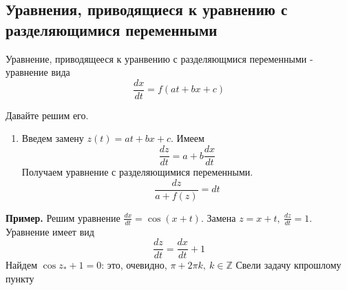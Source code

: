 \subsection{Уравнения, приводящиеся к уравнению с разделяющимися переменными}
\begin{defin}
Уравнение, приводящееся к уранвению с разделяющмися переменными - уравнение
вида 
\begin{equation}
    \frac{dx}{dt}=f(at+bx+c) \label{ODE_privrazd}
\end{equation}
\end{defin}
Давайте решим его. 
\begin{enumerate}
    \item Введем замену $z(t)=at+bx+c$. 
    Имеем
     $$\frac{dz}{dt}=a+b\frac{dx}{dt}$$ 
     Получаем уравнение с разделяющимися переменными. 
     $$\frac{dz}{a+f(z)}=dt$$
\end{enumerate}
\textbf{Пример.} Решим уравнение $\frac{dx}{dt}=\cos(x+t)$. Замена 
$z=x+t,~ \frac{dz}{dt}=1$. Уравнение имеет вид
$$\frac{dz}{dt}=\frac{dx}{dt}+1$$ 
Найдем $\cos{z_*}+1=0$: это, очевидно, $\pi+2\pi k,~k\in \mathbb{Z}$ 
Свели задачу кпрошлому пункту
